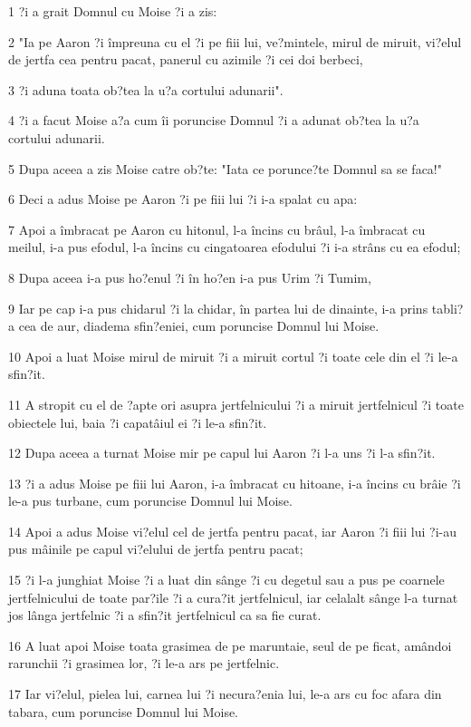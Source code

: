 \par 1 ?i a grait Domnul cu Moise ?i a zis:
\par 2 "Ia pe Aaron ?i împreuna cu el ?i pe fiii lui, ve?mintele, mirul de miruit, vi?elul de jertfa cea pentru pacat, panerul cu azimile ?i cei doi berbeci,
\par 3 ?i aduna toata ob?tea la u?a cortului adunarii".
\par 4 ?i a facut Moise a?a cum îi poruncise Domnul ?i a adunat ob?tea la u?a cortului adunarii.
\par 5 Dupa aceea a zis Moise catre ob?te: "Iata ce porunce?te Domnul sa se faca!"
\par 6 Deci a adus Moise pe Aaron ?i pe fiii lui ?i i-a spalat cu apa:
\par 7 Apoi a îmbracat pe Aaron cu hitonul, l-a încins cu brâul, l-a îmbracat cu meilul, i-a pus efodul, l-a încins cu cingatoarea efodului ?i i-a strâns cu ea efodul;
\par 8 Dupa aceea i-a pus ho?enul ?i în ho?en i-a pus Urim ?i Tumim,
\par 9 Iar pe cap i-a pus chidarul ?i la chidar, în partea lui de dinainte, i-a prins tabli?a cea de aur, diadema sfin?eniei, cum poruncise Domnul lui Moise.
\par 10 Apoi a luat Moise mirul de miruit ?i a miruit cortul ?i toate cele din el ?i le-a sfin?it.
\par 11 A stropit cu el de ?apte ori asupra jertfelnicului ?i a miruit jertfelnicul ?i toate obiectele lui, baia ?i capatâiul ei ?i le-a sfin?it.
\par 12 Dupa aceea a turnat Moise mir pe capul lui Aaron ?i l-a uns ?i l-a sfin?it.
\par 13 ?i a adus Moise pe fiii lui Aaron, i-a îmbracat cu hitoane, i-a încins cu brâie ?i le-a pus turbane, cum poruncise Domnul lui Moise.
\par 14 Apoi a adus Moise vi?elul cel de jertfa pentru pacat, iar Aaron ?i fiii lui ?i-au pus mâinile pe capul vi?elului de jertfa pentru pacat;
\par 15 ?i l-a junghiat Moise ?i a luat din sânge ?i cu degetul sau a pus pe coarnele jertfelnicului de toate par?ile ?i a cura?it jertfelnicul, iar celalalt sânge l-a turnat jos lânga jertfelnic ?i a sfin?it jertfelnicul ca sa fie curat.
\par 16 A luat apoi Moise toata grasimea de pe maruntaie, seul de pe ficat, amândoi rarunchii ?i grasimea lor, ?i le-a ars pe jertfelnic.
\par 17 Iar vi?elul, pielea lui, carnea lui ?i necura?enia lui, le-a ars cu foc afara din tabara, cum poruncise Domnul lui Moise.
